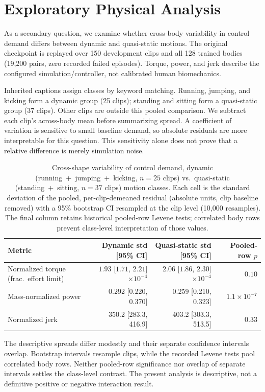 \section{Exploratory Physical Analysis}\label{sec:physics}
As a secondary question, we examine whether cross-body variability in
control demand differs between dynamic and quasi-static motions. The original
checkpoint is replayed over 150 development clips and all 128 trained bodies
(19,200 pairs, zero recorded failed episodes). Torque, power, and jerk describe
the configured simulation/controller, not calibrated human biomechanics.

Inherited captions assign classes by keyword matching. Running, jumping,
and kicking form a dynamic group (25 clips); standing and sitting form a
quasi-static group (37 clips). Other clips are outside this pooled comparison.
We subtract each clip's across-body mean before summarizing spread. A
coefficient of variation is sensitive to small baseline demand, so absolute
residuals are more interpretable for this question. This sensitivity alone
does not prove that a relative difference is merely simulation noise.
\begin{table}[t]
\centering
\small
\caption{Cross-shape variability of control demand, dynamic
(running~+~jumping~+~kicking, $n{=}25$ clips) vs.\ quasi-static
(standing~+~sitting, $n{=}37$ clips) motion classes. Each cell is the
standard deviation of the pooled, per-clip-demeaned residual (absolute
units, clip baseline removed) with a 95\% bootstrap CI resampled at the
clip level (10,000 resamples). The final column retains historical pooled-row Levene tests; correlated body rows prevent class-level interpretation of those values.}\label{tab:physical_analysis}
\begin{tabularx}{\linewidth}{@{}Yrrr@{}}
\toprule
Metric & Dynamic std [95\% CI] & Quasi-static std [95\% CI] & Pooled-row $p$ \\
\midrule
Normalized torque (frac.\ effort limit) & $1.93$ [$1.71$, $2.21$] $\times10^{-4}$ & $2.06$ [$1.86$, $2.30$] $\times10^{-4}$ & $0.10$ \\
Mass-normalized power & 0.292 [0.220, 0.370] & 0.259 [0.210, 0.323] & $1.1\times10^{-7}$ \\
Normalized jerk & 350.2 [283.3, 416.9] & 403.2 [303.3, 513.5] & 0.33 \\
\bottomrule
\end{tabularx}
\end{table}

The descriptive spreads differ modestly and their separate confidence
intervals overlap. Bootstrap intervals resample clips, while the recorded
Levene tests pool correlated body rows. Neither pooled-row significance nor
overlap of separate intervals settles the class-level contrast. The present
analysis is descriptive, not a definitive positive or negative interaction result.


